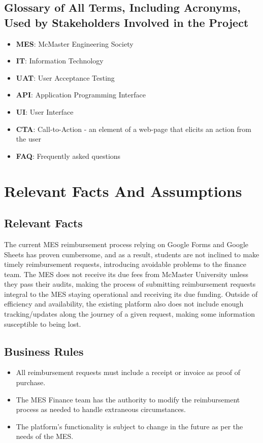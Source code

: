 \documentclass[12pt]{article}
\begin{document}
\subsection{Glossary of All Terms, Including Acronyms, Used by Stakeholders Involved in the Project}
\begin{itemize}
    \item \textbf{MES}: McMaster Engineering Society
    \item \textbf{IT}: Information Technology
    \item \textbf{UAT}: User Acceptance Testing
    \item \textbf{API}: Application Programming Interface
    \item \textbf{UI}: User Interface
    \item \textbf{CTA}: Call-to-Action - an element of a web-page that elicits an action from the user
    \item \textbf{FAQ}: Frequently asked questions
\end{itemize}


\section{Relevant Facts And Assumptions}
\subsection{Relevant Facts}
The current MES reimbursement process relying on Google Forms and Google Sheets has proven cumbersome, and as a result, students are not inclined to make timely reimbursement requests, introducing avoidable problems to the finance team.
The MES does not receive its due fees from McMaster University unless they pass their audits, making the process of submitting reimbursement requests integral to the MES staying operational and receiving its due funding.
Outside of efficiency and availability, the existing platform also does not include enough tracking/updates along the journey of a given request, making some information susceptible to being lost.

\subsection{Business Rules}
\begin{itemize}
    \item All reimbursement requests must include a receipt or invoice as proof of purchase.
    \item The MES Finance team has the authority to modify the reimbursement process as needed to handle extraneous circumstances.
    \item The platform’s functionality is subject to change in the future as per the needs of the MES.
\end{itemize}
\end{document}
